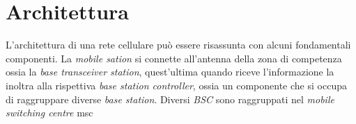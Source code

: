 \section{Architettura}
L'architettura di una rete cellulare può essere risassunta con alcuni fondamentali componenti. La \textit{mobile sation} si connette all'antenna
della zona di competenza ossia la \textit{base transceiver station}, quest'ultima quando riceve l'informazione la inoltra alla rispettiva \textit{base station controller}, ossia
un componente che si occupa di raggruppare diverse \textit{base station}. 
Diversi \textit{BSC} sono raggruppati nel \textit{mobile switching centre} \gls{msc}